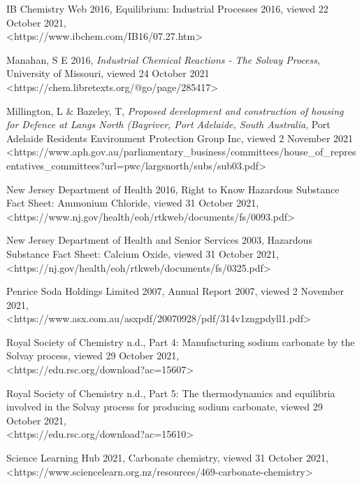 \documentclass[12pt, a4paper]{article}
\begin{document}
IB Chemistry Web 2016, Equilibrium: Industrial Processes 2016, viewed 22 October 2021, \\ \textless{https://www.ibchem.com/IB16/07.27.htm}\textgreater

Manahan, S E 2016, \emph{Industrial Chemical Reactions - The Solvay Process}, University of Missouri, viewed 24 October 2021 \\ \textless{https://chem.libretexts.org/@go/page/285417}\textgreater

Millington, L \& Bazeley, T, \emph{Proposed development and construction of housing for Defence at Langs North (Bayriver, Port Adelaide, South Australia}, Port Adelaide Residents Environment Protection Group Inc, viewed 2 November 2021 \\ \textless{https://www.aph.gov.au/parliamentary\_business/committees/house\_of\_representatives\_committees?url=pwc/largsnorth/subs/sub03.pdf}\textgreater

New Jersey Department of Health 2016, Right to Know Hazardous Substance Fact Sheet: Ammonium Chloride, viewed 31 October 2021, \\ \textless{https://www.nj.gov/health/eoh/rtkweb/documents/fs/0093.pdf}\textgreater

New Jersey Department of Health and Senior Services 2003, Hazardous Substance Fact Sheet: Calcium Oxide, viewed 31 October 2021, \\ \textless{https://nj.gov/health/eoh/rtkweb/documents/fs/0325.pdf}\textgreater

Penrice Soda Holdings Limited 2007, Annual Report 2007, viewed 2 November 2021, \\ \textless{https://www.asx.com.au/asxpdf/20070928/pdf/314v1zngpdyll1.pdf}\textgreater

Royal Society of Chemistry n.d., Part 4: Manufacturing sodium carbonate by the Solvay process, viewed 29 October 2021, \\ \textless{https://edu.rsc.org/download?ac=15607}\textgreater

Royal Society of Chemistry n.d., Part 5: The thermodynamics and equilibria involved in the Solvay process for producing sodium carbonate, viewed 29 October 2021, \\ \textless{https://edu.rsc.org/download?ac=15610}\textgreater

Science Learning Hub 2021, Carbonate chemistry, viewed 31 October 2021, \\ \textless{https://www.sciencelearn.org.nz/resources/469-carbonate-chemistry}\textgreater
\end{document}
